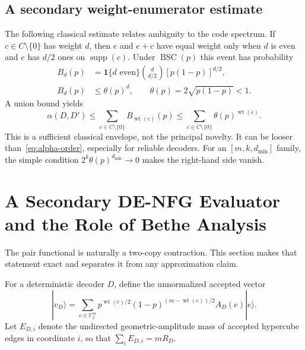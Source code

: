 \documentclass[journal]{IEEEtran}
\theoremstyle{definition}
\theoremstyle{remark}
\newcommand{\F}{\mathbb F}
\newcommand{\ind}{\mathbf 1}
\newcommand{\wt}{\operatorname{wt}}
\newcommand{\BSC}{\operatorname{BSC}}
\begin{document}
\subsection{A secondary weight-enumerator estimate}

The following classical estimate relates ambiguity to the code spectrum.  If
$c\in C\setminus\{0\}$ has weight $d$, then $e$ and $e+c$ have equal weight
only when $d$ is even and $e$ has $d/2$ ones on $\operatorname{supp}(c)$.
Under $\BSC(p)$ this event has probability
\begin{align}
 B_d(p)&=\ind\{d\text{ even}\}\binom{d}{d/2}
 [p(1-p)]^{d/2},\\
 B_d(p)&\le \theta(p)^d,\qquad
 \theta(p)=2\sqrt{p(1-p)}<1.
 \label{eq:bhattacharyya}
\end{align}
A union bound yields
\begin{equation}
 \alpha(D,D')\le
 \sum_{c\in C\setminus\{0\}}B_{\wt(c)}(p)
 \le\sum_{c\in C\setminus\{0\}}\theta(p)^{\wt(c)}.
 \label{eq:weight-envelope}
\end{equation}
This is a sufficient classical envelope, not the principal novelty.  It can be
looser than~\eqref{eq:alpha-order}, especially for reliable decoders.  For an
$[m,k,d_{\min}]$ family, the simple condition
$2^k\theta(p)^{d_{\min}}\to0$ makes the right-hand side vanish.

\section{A Secondary DE-NFG Evaluator and the Role of Bethe Analysis}
\label{sec:denfg}

The pair functional is naturally a two-copy contraction.  This section makes
that statement exact and separates it from any approximation claim.

For a deterministic decoder $D$, define the unnormalized accepted vector
\begin{equation}
 |v_D\rangle=\sum_{e\in\F_2^m}
 p^{\wt(e)/2}(1-p)^{(m-\wt(e))/2}A_D(e)|e\rangle.
 \label{eq:accepted-vector}
\end{equation}
Let $E_{D,i}$ denote the undirected geometric-amplitude mass of accepted
hypercube edges in coordinate $i$, so that
$\sum_iE_{D,i}=mR_D$.
\end{document}
